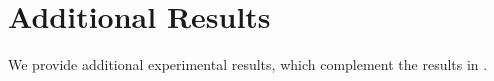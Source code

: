 




\section{Additional Results}
\label{sec:additional}

We provide additional experimental results, which complement the results in .

